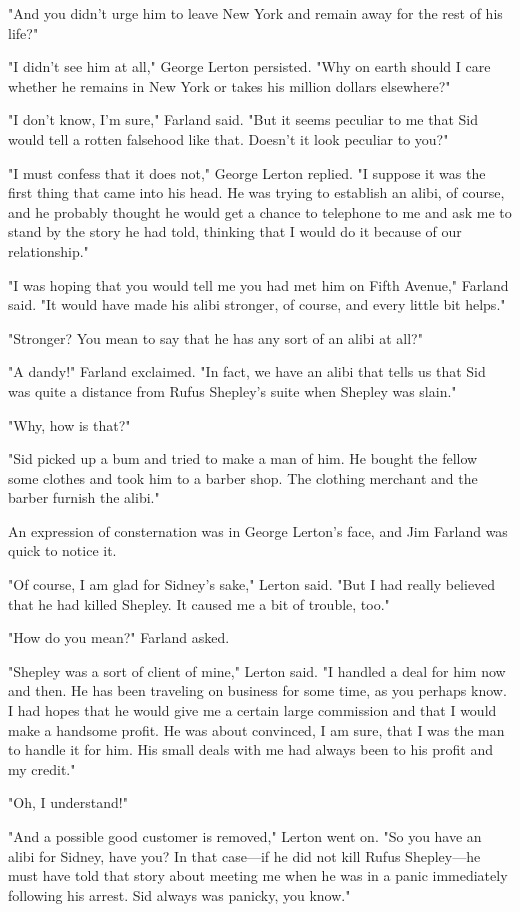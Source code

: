 \documentclass{novel}
\begin{document}
"And you didn't urge him to leave New York and remain away for the rest of his life?"

"I didn't see him at all," George Lerton persisted. "Why on earth should I care whether he remains in New York or takes his million dollars elsewhere?"

"I don't know, I'm sure," Farland said. "But it seems peculiar to me that Sid would tell a rotten falsehood like that. Doesn't it look peculiar to you?"

"I must confess that it does not," George Lerton replied. "I suppose it was the first thing that came into his head. He was trying to establish an alibi, of course, and he probably thought he would get a chance to telephone to me and ask me to stand by the story he had told, thinking that I would do it because of our relationship."

"I was hoping that you would tell me you had met him on Fifth Avenue," Farland said. "It would have made his alibi stronger, of course, and every little bit helps."

"Stronger? You mean to say that he has any sort of an alibi at all?"

"A dandy!" Farland exclaimed. "In fact, we have an alibi that tells us that Sid was quite a distance from Rufus Shepley's suite when Shepley was slain."

"Why, how is that?"

"Sid picked up a bum and tried to make a man of him. He bought the fellow some clothes and took him to a barber shop. The clothing merchant and the barber furnish the alibi."

An expression of consternation was in George Lerton's face, and Jim Farland was quick to notice it.

"Of course, I am glad for Sidney's sake," Lerton said. "But I had really believed that he had killed Shepley. It caused me a bit of trouble, too."

"How do you mean?" Farland asked.

"Shepley was a sort of client of mine," Lerton said. "I handled a deal for him now and then. He has been traveling on business for some time, as you perhaps know. I had hopes that he would give me a certain large commission and that I would make a handsome profit. He was about convinced, I am sure, that I was the man to handle it for him. His small deals with me had always been to his profit and my credit."

"Oh, I understand!"

"And a possible good customer is removed," Lerton went on. "So you have an alibi for Sidney, have you? In that case---if he did not kill Rufus Shepley---he must have told that story about meeting me when he was in a panic immediately following his arrest. Sid always was panicky, you know."
\end{document}
